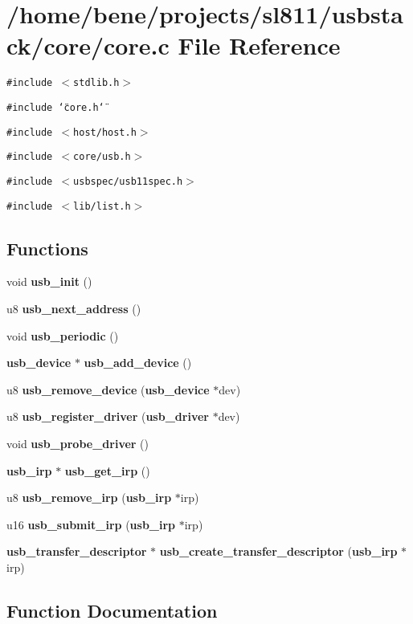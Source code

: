 \section{/home/bene/projects/sl811/usbstack/core/core.c File Reference}
\label{core_8c}
{\tt \#include $<$stdlib.h$>$}\par
{\tt \#include \char`\"{}core.h\char`\"{}}\par
{\tt \#include $<$host/host.h$>$}\par
{\tt \#include $<$core/usb.h$>$}\par
{\tt \#include $<$usbspec/usb11spec.h$>$}\par
{\tt \#include $<$lib/list.h$>$}\par
\subsection*{Functions}
\begin{CompactItemize}
\item 
void {\bf usb\_\-init} ()
\item 
u8 {\bf usb\_\-next\_\-address} ()
\item 
void {\bf usb\_\-periodic} ()
\item 
{\bf usb\_\-device} $\ast$ {\bf usb\_\-add\_\-device} ()
\item 
u8 {\bf usb\_\-remove\_\-device} ({\bf usb\_\-device} $\ast$dev)
\item 
u8 {\bf usb\_\-register\_\-driver} ({\bf usb\_\-driver} $\ast$dev)
\item 
void {\bf usb\_\-probe\_\-driver} ()
\item 
{\bf usb\_\-irp} $\ast$ {\bf usb\_\-get\_\-irp} ()
\item 
u8 {\bf usb\_\-remove\_\-irp} ({\bf usb\_\-irp} $\ast$irp)
\item 
u16 {\bf usb\_\-submit\_\-irp} ({\bf usb\_\-irp} $\ast$irp)
\item 
{\bf usb\_\-transfer\_\-descriptor} $\ast$ {\bf usb\_\-create\_\-transfer\_\-descriptor} ({\bf usb\_\-irp} $\ast$irp)
\end{CompactItemize}


\subsection{Function Documentation}
